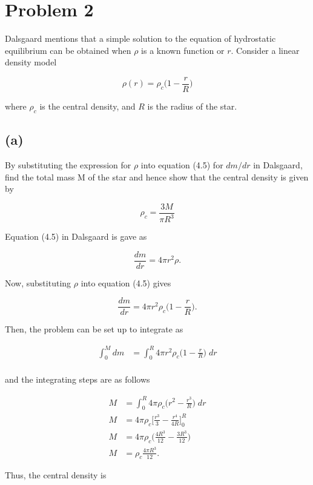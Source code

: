 \documentclass[11pt]{article}
\begin{document}
\clearpage


\section*{Problem 2}

Dalsgaard mentions that a simple solution to the equation of hydrostatic equilibrium can be obtained when $\rho$ is a known function or $r$. Consider a linear density model

$$
\rho(r) = \rho_{c}\Bigg(1 - \frac{r}{R}\Bigg)
$$

where $\rho_{c}$ is the central density, and $R$ is the radius of the star. 

\subsection*{(a)}

By substituting the expression for $\rho$ into equation (4.5) for $dm/dr$ in Dalsgaard, find the total mass M of the star and hence show that the central density is given by

$$
\rho_{c} = \frac{3M}{\pi R^{3}}
$$

Equation (4.5) in Dalsgaard is gave as

$$
\frac{dm}{dr} = 4\pi r^{2} \rho.
$$

Now, substituting $\rho$ into equation (4.5) gives

$$
\frac{dm}{dr} = 4\pi r^{2} \rho_{c}\Bigg(1 - \frac{r}{R}\Bigg).
$$

Then, the problem can be set up to integrate as 

\begin{align*}
    \int_{0}^{M} dm &= \int_{0}^{R} 4\pi r^{2} \rho_{c}\Bigg(1 - \frac{r}{R}\Bigg) \; dr \\
\end{align*}

and the integrating steps are as follows

\begin{align*}
    M &= \int_{0}^{R} 4\pi \rho_{c}\Bigg(r^{2} - \frac{r^{3}}{R}\Bigg) \; dr \\
    M & = 4\pi \rho_{c}\Bigg[\frac{r^{3}}{3} - \frac{r^{4}}{4R}\Bigg]_{0}^{R} \\
    M & = 4\pi \rho_{c}\Bigg(\frac{4R^{3}}{12} - \frac{3R^{3}}{12}\Bigg) \\
    M & = \rho_{c}\frac{4\pi R^{3}}{12}.
\end{align*}

Thus, the central density is 
\end{document}
